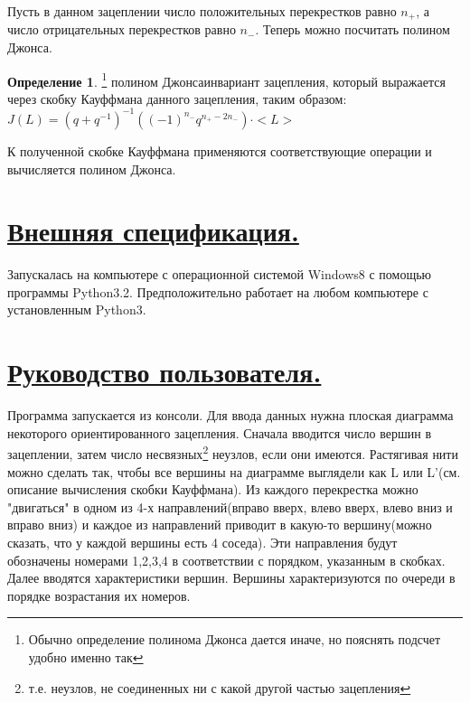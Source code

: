 \documentclass{article}
\theoremstyle{theorem}
\theoremstyle{definition}
\newtheorem{defi}[theo]{Определение}
\begin{document}
{Пусть в данном зацеплении число положительных перекрестков равно $n_{+}$, а число отрицательных перекрестков равно $n_{-}$. Теперь можно посчитать полином Джонса.}
\begin{defi}
\footnote[4]{Обычно определение полинома Джонса дается иначе, но пояснять подсчет удобно именно так}
полином Джонса инвариант зацепления, который выражается через скобку Кауффмана данного зацепления, таким образом:
\newline\normalsize{$J(L) = (q + q^{-1})^{-1}\left(\left(-1\right)^{n_{-}}q^{n_{+}-2n_{-}} \right)\cdot <L>$}
\end{defi}
{К полученной скобке Кауффмана применяются соответствующие операции и вычисляется полином Джонса.}

\section{\underline{Внешняя спецификация.}}
{Запускалась на компьютере с операционной системой Windows8 с помощью программы Python3.2. Предположительно работает на любом компьютере с установленным Python3.}

\section{\underline{Руководство пользователя.}}

{Программа запускается из  консоли. Для ввода данных нужна плоская диаграмма некоторого ориентированного зацепления. Сначала вводится число вершин в зацеплении, затем число несвязных\footnote[5]{т.е. неузлов, не соединенных ни с какой другой частью зацепления} неузлов, если они имеются. Растягивая нити можно сделать так, чтобы все вершины на диаграмме выглядели как L или L'(см. описание вычисления скобки Кауффмана). Из каждого перекрестка можно "двигаться" в одном из 4-х направлений(вправо вверх, влево вверх, влево вниз и вправо вниз) и каждое из направлений приводит в какую-то вершину(можно сказать, что у каждой вершины есть 4 соседа). Эти направления будут обозначены номерами 1,2,3,4 в соответствии с порядком, указанным в скобках. Далее вводятся характеристики вершин. Вершины характеризуются по очереди в порядке возрастания их номеров. }
\end{document}
